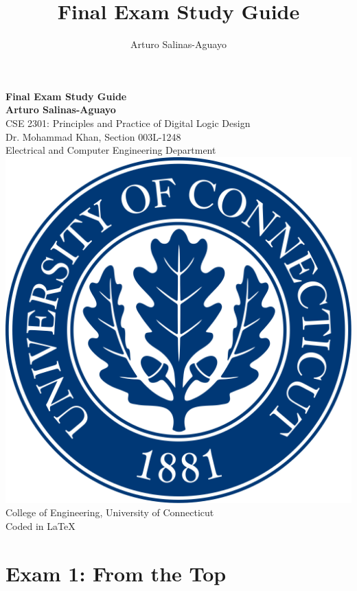 \documentclass[12pt]{article}
\author{Arturo Salinas-Aguayo}
\title{Final Exam Study Guide}
\begin{document}
\begin{titlepage}
	\centering
	\vspace*{3cm}
	\huge\textbf{Final Exam Study Guide}\\
	\vspace{5cm}
	\Large\textbf{Arturo Salinas-Aguayo}\\
	\normalsize
	CSE 2301: Principles and Practice of Digital Logic Design\\
	Dr. Mohammad Khan, Section 003L-1248\\
	Electrical and Computer Engineering Department
	\vfill
	\includegraphics[scale=0.1]{uconnlogo}\\
	College of Engineering, University of Connecticut\\
	\scriptsize{Coded in \LaTeX}
	\vspace*{1cm}
\end{titlepage}
\tableofcontents
\newpage
\section{Exam 1: From the Top}
\end{document}
